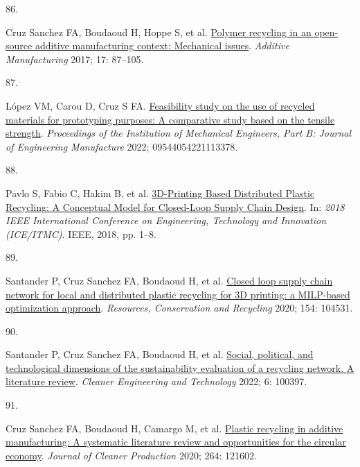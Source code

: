 \documentclass[
  12pt,
  a4paperpaper,
  onecolumn]{article}
\newlength{\cslhangindent}
\newlength{\csllabelwidth}
\newlength{\cslentryspacingunit} %
\newenvironment{CSLReferences}[2] %
 {%
  \setlength{\parindent}{0pt}
  \ifodd #1
  \let\oldpar\par
  \def\par{\hangindent=\cslhangindent\oldpar}
  \fi
  \setlength{\parskip}{#2\cslentryspacingunit}
 }%
 {}
\newcommand{\CSLLeftMargin}[1]{\parbox[t]{\csllabelwidth}{#1}}
\newcommand{\CSLRightInline}[1]{\parbox[t]{\linewidth - \csllabelwidth}{#1}\break}
\begin{document}
\begin{CSLReferences}{0}{0}
\leavevmode{}%
\CSLLeftMargin{86. }%
\CSLRightInline{Cruz Sanchez FA, Boudaoud H, Hoppe S, et al.
\href{https://doi.org/10.1016/j.addma.2017.05.013}{Polymer recycling in
an open-source additive manufacturing context: {Mechanical} issues}.
\emph{Additive Manufacturing} 2017; 17: 87--105.}

\leavevmode{}%
\CSLLeftMargin{87. }%
\CSLRightInline{López VM, Carou D, Cruz S FA.
\href{https://doi.org/10.1177/09544054221113378}{Feasibility study on
the use of recycled materials for prototyping purposes: {A} comparative
study based on the tensile strength}. \emph{Proceedings of the
Institution of Mechanical Engineers, Part B: Journal of Engineering
Manufacture} 2022; 09544054221113378.}

\leavevmode{}%
\CSLLeftMargin{88. }%
\CSLRightInline{Pavlo S, Fabio C, Hakim B, et al.
\href{https://doi.org/10.1109/ICE.2018.8436296}{{3D-Printing Based
Distributed Plastic Recycling}: {A Conceptual Model} for {Closed-Loop
Supply Chain Design}}. In: \emph{2018 {IEEE International Conference} on
{Engineering}, {Technology} and {Innovation} ({ICE}/{ITMC})}. {IEEE},
2018, pp. 1--8.}

\leavevmode{}%
\CSLLeftMargin{89. }%
\CSLRightInline{Santander P, Cruz Sanchez FA, Boudaoud H, et al.
\href{https://doi.org/10.1016/j.resconrec.2019.104531}{{Closed loop
supply chain network for local and distributed plastic recycling for 3D
printing: a MILP-based optimization approach}}. \emph{Resources,
Conservation and Recycling} 2020; 154: 104531.}

\leavevmode{}%
\CSLLeftMargin{90. }%
\CSLRightInline{Santander P, Cruz Sanchez FA, Boudaoud H, et al.
\href{https://doi.org/10.1016/j.clet.2022.100397}{Social, political, and
technological dimensions of the sustainability evaluation of a recycling
network. {A} literature review}. \emph{Cleaner Engineering and
Technology} 2022; 6: 100397.}

\leavevmode{}%
\CSLLeftMargin{91. }%
\CSLRightInline{Cruz Sanchez FA, Boudaoud H, Camargo M, et al.
\href{https://doi.org/10.1016/j.jclepro.2020.121602}{Plastic recycling
in additive manufacturing: {A} systematic literature review and
opportunities for the circular economy}. \emph{Journal of Cleaner
Production} 2020; 264: 121602.}


\end{CSLReferences}
\end{document}
